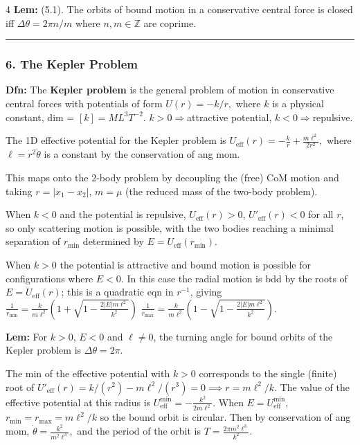 \documentclass[landscape, 8pt]{extarticle}
\begin{document}
\begin{multicols*}{4}
		\textbf{Lem:} (5.1). The orbits of bound motion in a conservative central force is closed iff $\Delta\theta=2\pi n/m$ where $n,m\in\mathbb{Z}$ are coprime.
		
		\hrule
		\vspace{-3pt}
		\subsubsection*{\tiny{6. The Kepler Problem}}
		\vspace*{-4pt}
		
		\textbf{Dfn:} The \textbf{Kepler problem} is the general problem of motion in conservative central forces with potentials of form
		$
		U(r) = -k/r,
		$
		where $k$ is a physical constant, dim = $[k]=ML^3T^{-2}$. $k>0 \Rightarrow$attractive potential, $k<0 \Rightarrow$repulsive.

		The 1D effective potential for the Kepler problem is
		$
		U_{\mathrm{eff}}(r) = -\frac{k}{r}+\frac{m\ell^2}{2r^2},
		$
		where $\ell=r^2\dot\theta$ is a constant by the conservation of ang mom.
		
		This maps onto the 2-body problem by decoupling the (free) CoM motion and taking $r=|x_1-x_2|$, $m=\mu$ (the reduced mass of the two-body problem).
		
		When $k<0$ and the potential is repulsive, $U_{\mathrm{eff}}(r)>0$, $U'_{\mathrm{eff}}(r)<0$ for all $r$, so only scattering motion is possible, with the two bodies reaching a minimal separation of $r_{\min}$ determined by $E=U_{\mathrm{eff}}(r_{\min})$.
		
		When $k>0$ the potential is attractive and bound motion is possible for configurations where $E<0$. In this case the radial motion is bdd by the roots of $E=U_{\mathrm{eff}}(r)$; this is a quadratic eqn in $r^{-1}$, giving
		$
		\frac{1}{r_{\min}}=\frac{k}{m\ell^2}\left(1+\sqrt{1-\frac{2|E|m\ell^2}{k^2}}\right)
		$
		$
		\frac{1}{r_{\max}}=\frac{k}{m\ell^2}\left(1-\sqrt{1-\frac{2|E|m\ell^2}{k^2}}\right).
		$
		
		\textbf{Lem:} For $k>0$, $E<0$ and $\ell\neq 0$, the turning angle for bound orbits of the Kepler problem is $\Delta\theta=2\pi$.
		
		The min of the effective potential with $k>0$ corresponds to the single (finite) root of
		$
		U'_{\mathrm{eff}}(r)=k/(r^2)-m\ell^2/(r^3)=0\implies r=m\ell^2/k.
		$
		The value of the effective potential at this radius is
		$
		U^{\min}_{\mathrm{eff}}=-\frac{k^2}{2m\ell^2}.
		$
		When $E=U^{\min}_{\mathrm{eff}}$, $r_{\min}=r_{\max}=m\ell^2/k$ so the bound orbit is circular. Then by conservation of ang mom,
		$
		\dot\theta = \frac{k^2}{m^2\ell^3},
		$
		and the period of the orbit is
		$
		T=\frac{2\pi m^2\ell^3}{k^2}.
		$
		

\end{multicols*}
\end{document}
